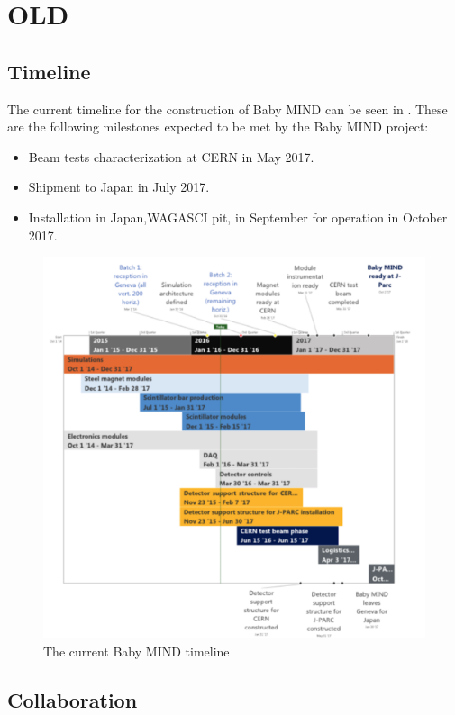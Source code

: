\section{OLD}
\subsection{Timeline}
The current timeline for the construction of Baby MIND can be seen in .
These are the following milestones expected to be met by the Baby MIND project:
\begin{itemize}
\item Beam tests characterization at CERN in May 2017.
\item Shipment to Japan in July 2017.
\item Installation in Japan,WAGASCI pit, in September for operation in October 2017.
\end{itemize}

\begin{figure}[h!]
\centering
\includegraphics[width=\textwidth]{figures/timeline.png}
\caption{The current Baby MIND timeline}
\label{fig:timeline}
\end{figure}


\subsection{Collaboration}


